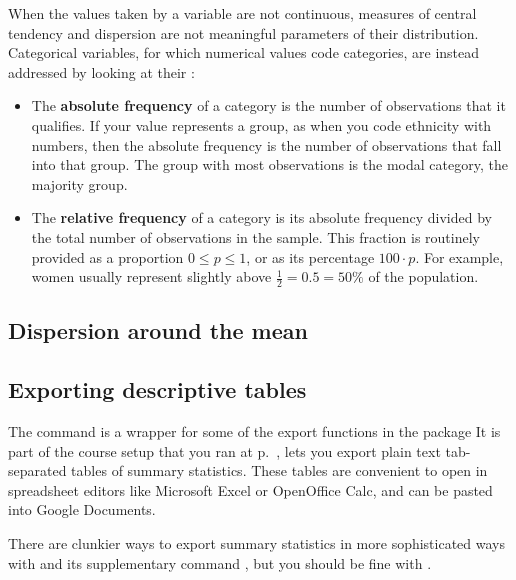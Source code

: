   When the values taken by a variable are not continuous, measures of central tendency and dispersion are not meaningful parameters of their distribution. Categorical variables, for which numerical values code categories, are instead addressed by looking at their :%

  \begin{itemize}
  	\item The \textbf{absolute frequency} of a category is the number of observations that it qualifies. If your value represents a group, as when you code ethnicity with numbers, then the absolute frequency is the number of observations that fall into that group. The group with most observations is the modal category, \ie the majority group.%

  	\item The \textbf{relative frequency} of a category is its absolute frequency divided by the total number of observations in the sample. This fraction is routinely provided as a proportion $0 \leq p \leq 1$, or as its percentage $100 \cdot p$. For example, women usually represent slightly above $\frac{1}{2}=0.5=50\%$ of the population.%
  \end{itemize}

	\subsection{Dispersion around the mean}%


	\subsection{Exporting descriptive tables}

  \label{cmd:stab}%
  The  command is a wrapper for some of the export functions in the  package It is part of the course setup that you ran at p.~\pageref{sec:course-setup}, lets you export plain text tab-separated tables of summary statistics. These tables are convenient to open in spreadsheet editors like Microsoft Excel or OpenOffice Calc, and can be pasted into Google Documents.%

  There are clunkier ways to export summary statistics in more sophisticated ways with  and its supplementary command , but you should be fine with .%

